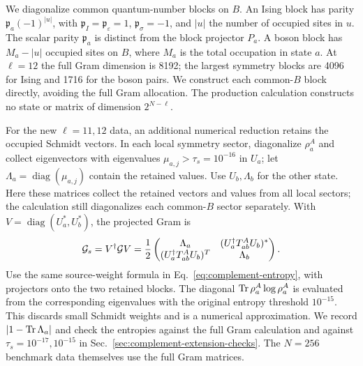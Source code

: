 We diagonalize common quantum-number blocks on $B$. An Ising block
has parity $\mathfrak p_a(-1)^{|u|}$, with
$\mathfrak p_I=\mathfrak p_\varepsilon=1$,
$\mathfrak p_\sigma=-1$, and $|u|$ the number of occupied sites in $u$.
The scalar parity $\mathfrak p_a$ is distinct from the block projector $P_a$.
A boson block has $M_a-|u|$ occupied sites on $B$, where
$M_a$ is the total occupation in state $a$.
At $\ell=12$ the full Gram dimension is 8192; the largest symmetry
blocks are 4096 for Ising and 1716 for the boson pairs. We construct
each common-$B$ block directly, avoiding the full Gram allocation.
The production calculation constructs no state or matrix of dimension $2^{N-\ell}$.

For the new $\ell=11,12$ data, an additional numerical reduction
retains the occupied Schmidt vectors. In each local symmetry sector,
diagonalize $\rho_a^A$ and collect eigenvectors with eigenvalues
$\mu_{a,j}>\tau_s=10^{-16}$ in $U_a$; let
$\Lambda_a=\operatorname{diag}(\mu_{a,j})$ contain the retained values.
Use $U_b,\Lambda_b$ for the other state. Here these matrices collect
the retained vectors and values from all local sectors; the calculation
still diagonalizes each common-$B$ sector separately. With
$V=\operatorname{diag}(U_a^*,U_b^*)$, the projected Gram is
\begin{equation}
 {\cal G}_s=V^\dagger{\cal G}V
 =\frac12\begin{pmatrix}
 \Lambda_a &(U_a^\dagger T_{ab}^A U_b)^*\\
 (U_a^\dagger T_{ab}^A U_b)^T&\Lambda_b
 \end{pmatrix}.
 \label{eq:complement-support}
\end{equation}
Use the same source-weight formula in Eq.~\eqref{eq:complement-entropy},
with projectors onto the two retained blocks. The diagonal
$\operatorname{Tr}\rho_a^A\log\rho_a^A$ is evaluated from the corresponding
eigenvalues with the original entropy threshold $10^{-15}$.
This discards small Schmidt weights and is a numerical approximation.
We record $|1-\operatorname{Tr}\Lambda_a|$ and check the entropies against the full
Gram calculation and against $\tau_s=10^{-17},10^{-15}$ in
Sec.~\ref{sec:complement-extension-checks}. The $N=256$ benchmark
data themselves use the full Gram matrices.

